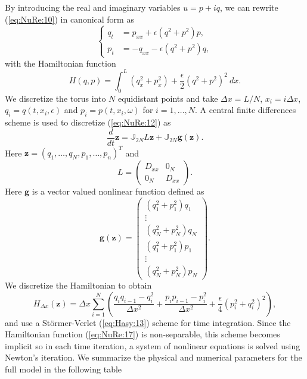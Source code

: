 By introducing the real and imaginary variables $u = p + iq$, we can rewrite (\ref{eq:NuRe:10}) in canonical form as
\begin{equation} \label{eq:NuRe:12}
\left\{
\begin{aligned}
 q_t &= p_{xx} + \epsilon (q^2+p^2)p, \\
 p_t &= -q_{xx} - \epsilon (q^2 + p^2)q,
\end{aligned}
\right.
\end{equation}
with the Hamiltonian function
\begin{equation} \label{eq:NuRe:13}
	H(q,p) = \int_{0}^{L} (q_x^2 + p_x^2) + \frac \epsilon 2 (q^2 + p^2)^2\ dx.
\end{equation}
We discretize the torus into $N$ equidistant points and take $\Delta x = L/N$, $x_i = i\Delta x$, $q_i=q(t,x_i,\epsilon)$ and $p_i = p(t,x_i,\omega)$ for $i = 1 ,\dots,N$. A central finite differences scheme is used to discretize (\ref{eq:NuRe:12}) as
\begin{equation}  \label{eq:NuRe:14}
	\frac{d}{dt} \mathbf z = \mathbb J_{2N} L\mathbf z + \mathbb J_{2N} \mathbf g(\mathbf z).
\end{equation}
Here $\mathbf z = (q_1,\dots,q_N,p_1,\dots,p_n)^T$ and
\begin{equation}  \label{eq:NuRe:15}
	L = 
	\begin{pmatrix}
		D_{xx} & 0_N \\
		0_N & D_{xx}
	\end{pmatrix}.
\end{equation}
Here $\mathbf g$ is a vector valued nonlinear function defined as
\begin{equation}  \label{eq:NuRe:16}
	\mathbf g(\mathbf z) =
	\begin{pmatrix}
	(q_1^2 + p_1^2)q_1 \\
	\vdots \\
	(q_N^2 + p_N^2)q_N \\
	(q_1^2 + p_1^2)p_1 \\
	\vdots \\
	(q_N^2 + p_N^2)p_N
	\end{pmatrix}.
\end{equation}
We discretize the Hamiltonian to obtain
\begin{equation}  \label{eq:NuRe:17}
	H_{\Delta x}(\mathbf z) = {\Delta x}\sum_{i=1}^{N} \left( \frac{q_i q_{i-1} - q_i^2}{\Delta x ^2} + \frac{p_i p_{i-1} - p_i^2}{\Delta x ^2} + \frac \epsilon 4 (p_i^2 + q_i^2)^2  \right),
\end{equation}
and use a St\"ormer-Verlet (\ref{eq:Hasy:13}) scheme for time integration. Since the Hamiltonian function (\ref{eq:NuRe:17}) is non-separable, this scheme becomes implicit so in each time iteration, a system of nonlinear equations is solved using Newton's iteration. We summarize the physical and numerical parameters for the full model in the following table

